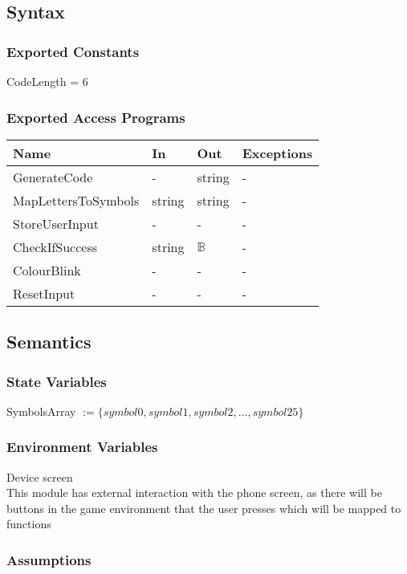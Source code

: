 \documentclass[12pt, titlepage]{article}
\begin{document}
\subsection{Syntax}

\subsubsection{Exported Constants}
CodeLength = 6

\subsubsection{Exported Access Programs}

\begin{center}
\begin{tabular}{p{5cm} p{4cm} p{4cm} p{2cm}}
\hline
\textbf{Name} & \textbf{In} & \textbf{Out} & \textbf{Exceptions} \\
\hline
GenerateCode & - & string & - \\
MapLettersToSymbols & string & string & - \\
StoreUserInput & - & - & - \\
CheckIfSuccess & string & $\mathds{B}$ & - \\
ColourBlink & - & - & - \\
ResetInput & - & - & - \\
\hline
\end{tabular}
\end{center}

\subsection{Semantics}

\subsubsection{State Variables}
SymbolsArray $:= \{symbol0,symbol1,symbol2,…,symbol25\}$

\subsubsection{Environment Variables}

Device screen\\
This module has external interaction with the phone screen, as there will be buttons in the game environment that the user presses which will be mapped to functions

\subsubsection{Assumptions}
\end{document}
